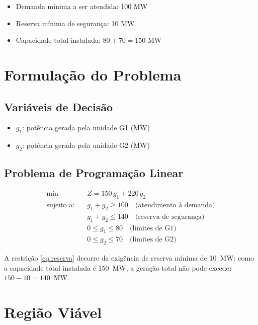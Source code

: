 \documentclass[12pt,a4paper]{article}
\begin{document}
\begin{itemize}
    \item Demanda mínima a ser atendida: 100 MW
    \item Reserva mínima de segurança: 10 MW
    \item Capacidade total instalada: $80 + 70 = 150$ MW
\end{itemize}

\section{Formulação do Problema}

\subsection{Variáveis de Decisão}

\begin{itemize}
    \item $g_1$: potência gerada pela unidade G1 (MW)
    \item $g_2$: potência gerada pela unidade G2 (MW)
\end{itemize}

\subsection{Problema de Programação Linear}

\begin{align}
\min \quad & Z = 150\,g_1 + 220\,g_2 \label{eq:obj}\\[6pt]
\text{sujeito a:} \quad & g_1 + g_2 \geq 100 \quad \text{(atendimento à demanda)} \label{eq:demanda}\\
& g_1 + g_2 \leq 140 \quad \text{(reserva de segurança)} \label{eq:reserva}\\
& 0 \leq g_1 \leq 80 \quad \text{(limites de G1)} \label{eq:g1}\\
& 0 \leq g_2 \leq 70 \quad \text{(limites de G2)} \label{eq:g2}
\end{align}

\noindent A restrição \eqref{eq:reserva} decorre da exigência de reserva mínima de 10~MW: como a capacidade total instalada é 150~MW, a geração total não pode exceder $150 - 10 = 140$~MW.

\section{Região Viável}
\end{document}
